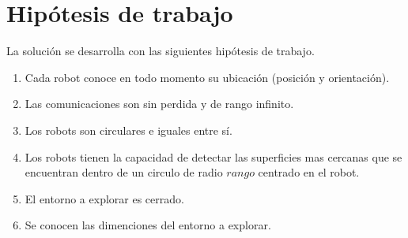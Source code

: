 
\section{Hipótesis de trabajo}\label{sec:hip}
La solución se desarrolla con las siguientes hipótesis de trabajo.
\begin{enumerate}[label=(\roman*)]
  \item Cada robot conoce en todo momento su ubicación (posición y orientación).
  \item Las comunicaciones son sin perdida y de rango infinito.
  \item Los robots son circulares e iguales entre sí.
  \item Los robots tienen la capacidad de detectar las superficies mas cercanas
    que se encuentran dentro de un circulo de radio $rango$ centrado en el
    robot.
  \item El entorno a explorar es cerrado.
  \item Se conocen las dimenciones del entorno a explorar.
\end{enumerate}


